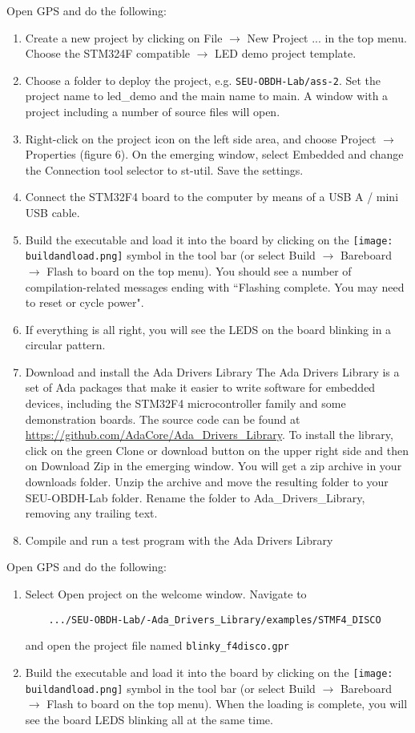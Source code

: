Open GPS and do the following:
\begin{enumerate}
\item Create a new project by clicking on File $\rightarrow$ New Project ... in the top menu. Choose the STM324F compatible $\rightarrow$ LED demo project template.
\item	Choose a folder to deploy the project, e.g. \texttt{SEU-OBDH-Lab/ass-2}. Set the project name to led\_demo and the main name to main. A window with a project including a number of source files will open.
\item	Right-click on the project icon on the left side area, and choose Project $\rightarrow$ Properties (figure 6). On the emerging window, select Embedded and change the Connection tool selector to st-util. Save the settings.
\item	Connect the STM32F4 board to the computer by means of a USB A / mini USB cable.
\item	Build the executable and load it into the board by clicking on the
\hbox{\texttt{[image: buildandload.png]}} symbol in the tool bar (or select Build $\rightarrow$ Bareboard $\rightarrow$ Flash to board on the top menu). You should see a number of compilation-related messages ending with ``Flashing complete. You may need to reset or cycle power".
\item	If everything is all right, you will see the LEDS on the board blinking in a circular pattern.
\item Download and install the Ada Drivers Library
The Ada Drivers Library is a set of Ada packages that make it easier to write software for embedded devices, including the STM32F4 microcontroller family and some demonstration boards. The source code can be found at \url{https://github.com/AdaCore/Ada\_Drivers\_Library}. To install the library, click on the green Clone or download button on the upper right side and then on Download Zip in the emerging window. You will get a zip archive in your downloads folder. Unzip the archive and move the resulting folder to your SEU-OBDH-Lab folder. Rename the folder to Ada\_Drivers\_Library, removing any trailing text.
\item Compile and run a test program with the Ada Drivers Library
\end{enumerate}
Open GPS and do the following:
\begin{enumerate}
\item Select Open project on the welcome window. Navigate to

\begin{BVerbatim}
	.../SEU-OBDH-Lab/-Ada_Drivers_Library/examples/STMF4_DISCO
\end{BVerbatim}

and open the project file named \texttt{blinky\_f4disco.gpr}

\item	Build the executable and load it into the board by clicking on the \hbox{\texttt{[image: buildandload.png]}} symbol in the tool bar (or select Build $\rightarrow$ Bareboard $\rightarrow$ Flash to board on the top menu). When the loading is complete, you will see the board LEDS blinking all at the same time.
\end{enumerate}

